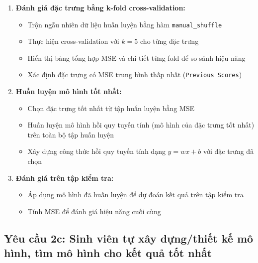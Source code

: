 \begin{enumerate}
	\item \textbf{Đánh giá đặc trưng bằng k-fold cross-validation:}
	      \begin{itemize}
		      \item Trộn ngẫu nhiên dữ liệu huấn luyện bằng hàm \texttt{manual\_shuffle}
		      \item Thực hiện cross-validation với $k=5$ cho từng đặc trưng
		      \item Hiển thị bảng tổng hợp MSE và chi tiết từng fold để so sánh hiệu năng
		      \item Xác định đặc trưng có MSE trung bình thấp nhất (\texttt{Previous Scores})
	      \end{itemize}

	\item \textbf{Huấn luyện mô hình tốt nhất:}
	      \begin{itemize}
		      \item Chọn đặc trưng tốt nhất từ tập huấn luyện bằng MSE
		      \item Huấn luyện mô hình hồi quy tuyến tính (mô hình của đặc trưng tốt nhất) trên toàn bộ tập huấn luyện
		      \item Xây dựng công thức hồi quy tuyến tính dạng $y = wx + b$ với đặc trưng đã chọn
	      \end{itemize}

	\item \textbf{Đánh giá trên tập kiểm tra:}
	      \begin{itemize}
		      \item Áp dụng mô hình đã huấn luyện để dự đoán kết quả trên tập kiểm tra
		      \item Tính MSE để đánh giá hiệu năng cuối cùng
	      \end{itemize}
\end{enumerate}

\subsection{Yêu cầu 2c: Sinh viên tự xây dựng/thiết kế mô hình, tìm mô hình cho kết quả tốt nhất}
